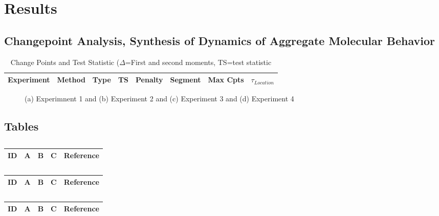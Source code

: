 \section{Results}

\subsection{Changepoint Analysis, Synthesis of Dynamics of Aggregate Molecular Behavior}

\begin{table}[H]\tiny
  \caption{Change Points and Test Statistic ($\Delta$=First and second moments, TS=test statistic}
\begin{tabular}{rlp{0.7cm}lllll}
\hline	 
Experiment &Method & Type & TS & Penalty & Segment & Max Cpts & $\tau_{Location}$ \\
\hline
\hline
\end{tabular}
\end{table}

\begin{figure}[H]
\centering
\caption{ (a) Experimnent 1 and (b) Experiment 2 and (c) Experiment 3 and (d) Experiment 4 }
\label{fig:Figure1}
\end{figure}

\subsection{Tables}

\centering
\begin{table}[H]\footnotesize
	\caption{}
	\begin{tabular}{rp{1cm}p{2cm}p{3cm}p{1cm}}
		\hline
		ID & A & B & C & Reference \\
		\hline
		\hline
	\end{tabular}
\end{table}
\raggedright

\centering
\begin{table}[H]\footnotesize
	\caption{}
	\begin{tabular}{rp{1cm}p{2cm}p{3cm}p{1cm}}
		\hline
		ID & A & B & C & Reference \\
		\hline
		\hline
	\end{tabular}
\end{table}
\raggedright

\centering
\begin{table}[H]\footnotesize
	\caption{}
	\begin{tabular}{rp{1cm}p{2cm}p{3cm}p{1cm}}
		\hline
		ID & A & B & C & Reference \\
		\hline
		\hline
	\end{tabular}
\end{table}
\raggedright


